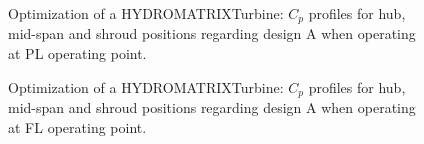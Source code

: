 \begin{figure}[h!]
\begin{minipage}[b]{1\linewidth}
 \centering
\end{minipage}
\caption{Optimization of a HYDROMATRIX\circledR Turbine: $C_p$ profiles for hub, mid-span and shroud positions regarding design A when operating at PL operating point. }
\label{LOADPLM}
\end{figure}


\begin{figure}[h!]
\begin{minipage}[b]{1\linewidth}
 \centering
\end{minipage}
\caption{Optimization of a HYDROMATRIX\circledR Turbine: $C_p$ profiles for hub, mid-span and shroud positions regarding design A when operating at FL operating point.}
\label{LOADFLM}
\end{figure}

